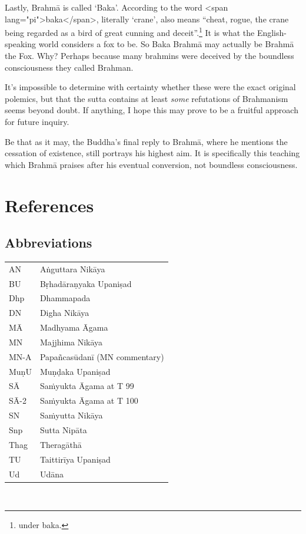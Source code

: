 \documentclass[10pt, openright]{book}
\begin{document}
Lastly, Brahmā is called ‘Baka’. According to \cite{Monier-Williams} the word <span lang="pi">baka</span>, literally ‘crane’, also means “cheat, rogue, the crane being regarded as a bird of great cunning and deceit”.\footnote {\cite{Monier-Williams} under baka.} It is what the English-speaking world considers a fox to be. So Baka Brahmā may actually be Brahmā the Fox. Why? Perhaps because many brahmins were deceived by the boundless consciousness they called Brahman.


It’s impossible to determine with certainty whether these were the exact original polemics, but that the sutta contains at least \textit{some} refutations of Brahmanism seems beyond doubt. If anything, I hope this may prove to be a fruitful approach for future inquiry.


Be that as it may, the Buddha’s final reply to Brahmā, where he mentions the cessation of existence, still portrays his highest aim. It is specifically this teaching which Brahmā praises after his eventual conversion, not boundless consciousness.


\chapter{References}
\section{Abbreviations}
\bgroup
\def\arraystretch{1.2}
\begin{tabular}{ll}
AN & Aṅguttara Nikāya \\
BU & Bṛhadāraṇyaka Upaniṣad \\
Dhp & Dhammapada \\
DN & Digha Nikāya \\
MĀ & Madhyama Āgama \\
MN & Majjhima Nikāya \\
MN-A & Papañcasūdanī (MN commentary) \\
MuṇU & Muṇḍaka Upaniṣad \\
SĀ & Saṁyukta Āgama at T 99 \\
SĀ-2 & Saṁyukta Āgama at T 100 \\
SN & Saṁyutta Nikāya \\
Snp & Sutta Nipāta \\
Thag & Theragāthā \\
TU & Taittirīya Upaniṣad \\
Ud & Udāna \\

\end{tabular}\
\egroup
\end{document}
